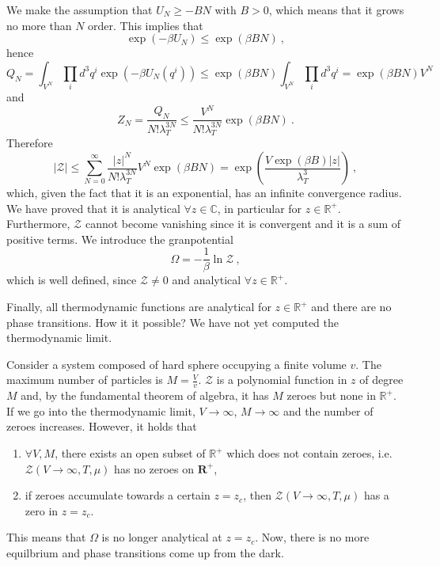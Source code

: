     We make the assumption that $U_N \geq - BN$ with $B > 0$, which means that it grows no more than $N$ order. This implies that 
    \begin{equation*}
        \exp(- \beta U_N) \leq \exp(\beta B N) ~,
    \end{equation*}
    hence 
    \begin{equation*}
        Q_N = \int_{V^N} \prod_i d^3 q^i \exp (- \beta U_N(q^i)) \leq \exp(\beta B N) \int_{V^N}\prod_i d^3 q^i = \exp(\beta B N) V^N 
    \end{equation*}
    and 
    \begin{equation*}
        Z_N = \frac{Q_N}{N! \lambda_T^{3N}} \leq \frac{V^N}{N! \lambda^{3N}_T} \exp(\beta B N) ~.
    \end{equation*}
    Therefore 
    \begin{equation*}
        |\mathcal Z| \leq \sum_{N=0}^\infty \frac{|z|^N}{N! \lambda_T^{3N}} V^N \exp(\beta B N) = \exp(\frac{V \exp(\beta B) |z|}{\lambda_T^3}) ~,
    \end{equation*}
    which, given the fact that it is an exponential, has an infinite convergence radius. We have proved that it is analytical $\forall z \in \mathbb C$, in particular for $z \in \mathbb R^+$. Furthermore, $\mathcal Z$ cannot become vanishing since it is convergent and it is a sum of positive terms. We introduce the granpotential 
    \begin{equation*}
        \Omega = - \frac{1}{\beta} \ln \mathcal Z ~,
    \end{equation*}
    which is well defined, since $\mathcal Z \neq 0$ and analytical $\forall z \in \mathbb R^+$. 

    Finally, all thermodynamic functions are analytical for $z \in \mathbb R^+$ and there are no phase transitions. How it it possible? We have not yet computed the thermodynamic limit.

    Consider a system composed of hard sphere occupying a finite volume $v$. The maximum number of particles is $M = \frac{V}{v}$. $\mathcal Z$ is a polynomial function in $z$ of degree $M$ and, by the fundamental theorem of algebra, it has $M$ zeroes but none in $\mathbb R^+$. If we go into the thermodynamic limit, $V \rightarrow \infty$, $M \rightarrow \infty$ and the number of zeroes increases. However, it holds that 
    \begin{enumerate}
        \item $\forall V, M$, there exists an open subset of $\mathbb R^+$ which does not contain zeroes, i.e. $\mathcal Z (V \rightarrow \infty, T, \mu)$ has no zeroes on $\mathbf R^+$,
        \item if zeroes accumulate towards a certain $z = z_c$, then  $\mathcal Z (V \rightarrow \infty, T, \mu)$ has a zero in $z = z_c$.
    \end{enumerate}
    This means that $\Omega$ is no longer analytical at $z = z_c$. Now, there is no more equilbrium and phase transitions come up from the dark. 


